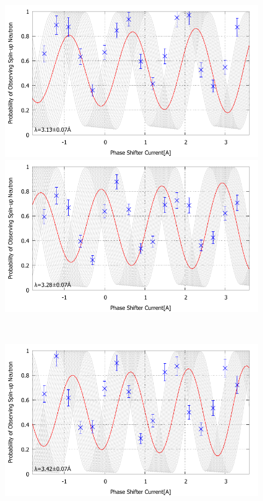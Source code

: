 \begin{figure}[H]
\begin{minipage}{0.5\hsize}
\includegraphics[width=\hsize]{discussion/FD/IT_s_440.pdf}
\end{minipage}
\begin{minipage}{0.5\hsize}
\includegraphics[width=\hsize]{discussion/FD/IT_s_460.pdf}
\end{minipage}\\
\begin{minipage}{0.5\hsize}
\includegraphics[width=\hsize]{discussion/FD/IT_s_480.pdf}

\end{minipage}
\end{figure}
